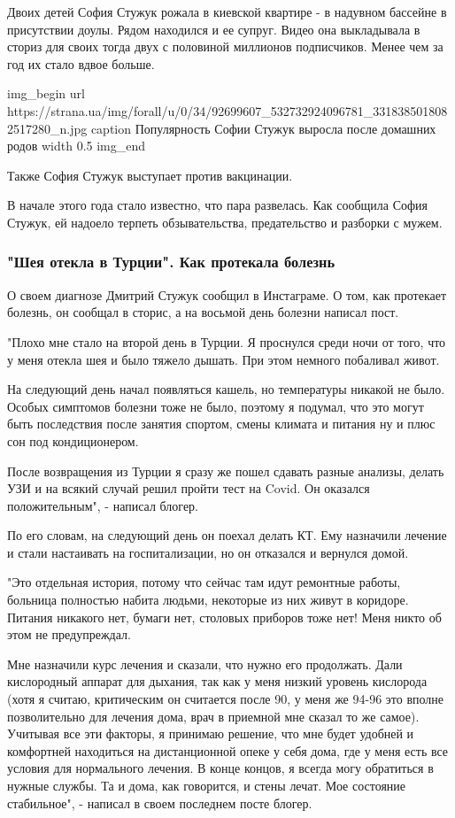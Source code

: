 Двоих детей София Стужук рожала в киевской квартире - в надувном
бассейне в присутствии доулы. Рядом находился и ее супруг. Видео она
выкладывала в сториз для своих тогда двух с половиной миллионов
подписчиков. Менее чем за год их стало вдвое больше.

\ifcmt
img_begin 
	url https://strana.ua/img/forall/u/0/34/92699607_532732924096781_3318385018082517280_n.jpg
	caption Популярность Софии Стужук выросла после домашних родов
	width 0.5
img_end
\fi

Также София Стужук выступает против вакцинации.

В начале этого года стало известно, что пара развелась. Как сообщила
София Стужук, ей надоело терпеть обзывательства, предательство и
разборки с мужем.

\subsubsection{"Шея отекла в Турции". Как протекала болезнь}

О своем диагнозе Дмитрий Стужук сообщил в Инстаграме. О том, как
протекает болезнь, он сообщал в сторис, а на восьмой день болезни
написал пост.

"Плохо мне стало на второй день в Турции. Я проснулся среди ночи от
того, что у меня отекла шея и было тяжело дышать. При этом немного
побаливал живот.  ⠀

На следующий день начал появляться кашель, но температуры никакой не
было. Особых симптомов болезни тоже не было, поэтому я подумал, что
это могут быть последствия после занятия спортом, смены климата и
питания ну и плюс сон под кондиционером.

После возвращения из Турции я сразу же пошел сдавать разные анализы, делать УЗИ и на всякий случай решил пройти тест на Covid. Он оказался положительным", - написал блогер.

По его словам, на следующий день он поехал делать КТ. Ему назначили
лечение и стали настаивать на госпитализации, но он отказался и
вернулся домой.

"Это отдельная история, потому что сейчас там идут ремонтные работы,
больница полностью набита людьми, некоторые из них живут в коридоре.
Питания никакого нет, бумаги нет, столовых приборов тоже нет! Меня
никто об этом не предупреждал. 

Мне назначили курс лечения и сказали, что нужно его продолжать. Дали
кислородный аппарат для дыхания, так как у меня низкий уровень
кислорода (хотя я считаю, критическим он считается после 90, у меня
же 94-96 это вполне позволительно для лечения дома, врач в приемной
мне сказал то же самое).  ⠀ Учитывая все эти факторы, я принимаю
решение, что мне будет удобней и комфортней находиться на
дистанционной опеке у себя дома, где у меня есть все условия для
нормального лечения. В конце концов, я всегда могу обратиться в
нужные службы. Та и дома, как говорится, и стены лечат. Мое состояние
стабильное", - написал в своем последнем посте блогер.

